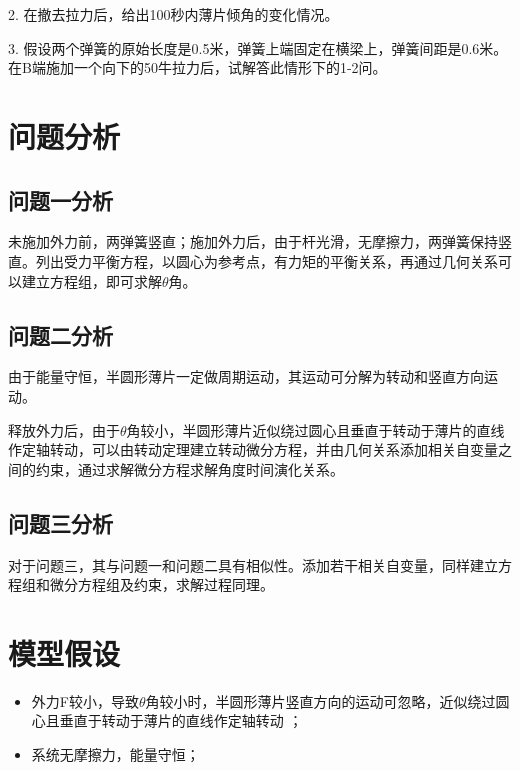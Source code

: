 \documentclass[withoutpreface,bwprint]{cumcmthesis} %
\begin{document}
	2.	在撤去拉力后，给出100秒内薄片倾角的变化情况。
	
	3.	假设两个弹簧的原始长度是0.5米，弹簧上端固定在横梁上，弹簧间距是0.6米。在B端施加一个向下的50牛拉力后，试解答此情形下的1-2问。
	
	
	\section{问题分析}
	\subsection{问题一分析}
	未施加外力前，两弹簧竖直；施加外力后，由于杆光滑，无摩擦力，两弹簧保持竖直。列出受力平衡方程，以圆心为参考点，有力矩的平衡关系，再通过几何关系可以建立方程组，即可求解$\theta$角。
	
	\subsection{问题二分析}
	由于能量守恒，半圆形薄片一定做周期运动，其运动可分解为转动和竖直方向运动。
	
	释放外力后，由于$\theta$角较小，半圆形薄片近似绕过圆心且垂直于转动于薄片的直线作定轴转动，可以由转动定理建立转动微分方程，并由几何关系添加相关自变量之间的约束，通过求解微分方程求解角度时间演化关系。
	
	\subsection{问题三分析}
	对于问题三，其与问题一和问题二具有相似性。添加若干相关自变量，同样建立方程组和微分方程组及约束，求解过程同理。
	
	\section{模型假设}
	\begin{itemize}
		\item 外力F较小，导致$\theta$角较小时，半圆形薄片竖直方向的运动可忽略，近似绕过圆心且垂直于转动于薄片的直线作定轴转动	；
		\item  系统无摩擦力，能量守恒；	
	\end{itemize}
	
\end{document}
